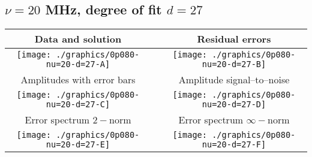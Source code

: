 

% 

\clearpage{}
\break{}

\subsection{$\nu = 20$ MHz, degree of fit $d = 27$}

\begin{table}[h]
    \begin{center}
        \begin{tabular}{ccc}
            Data and solution & \quad & Residual errors \\\hline
            \texttt{[image: ./graphics/0p080-nu=20-d=27-A]} &&
            \texttt{[image: ./graphics/0p080-nu=20-d=27-B]} \\[15pt]
            Amplitudes with error bars && Amplitude signal--to--noise \\\hline
            \texttt{[image: ./graphics/0p080-nu=20-d=27-C]} &&
            \texttt{[image: ./graphics/0p080-nu=20-d=27-D]} \\[15pt]
            Error spectrum $2-$norm && Error spectrum $\infty-$norm \\\hline
            \texttt{[image: ./graphics/0p080-nu=20-d=27-E]} &&
            \texttt{[image: ./graphics/0p080-nu=20-d=27-F]} \\[15pt]
        \end{tabular}
    \end{center}
\label{fig:elev=80, nu=20}
\end{table}



\endinput
